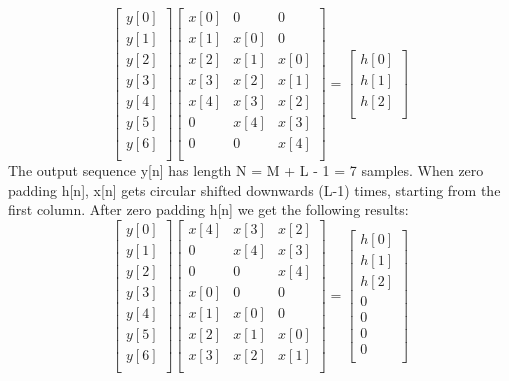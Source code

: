\documentclass{article}
\begin{document}
\[
\begin{bmatrix}
   y[0] \\
    y[1]   \\
    y[2] \\
    y[3]   \\  
    y[4]   \\ 
    y[5]   \\ 
    y[6]   \\ 
\end{bmatrix}
\begin{bmatrix}
    x[0] & 0  & 0  \\
    x[1] & x[0]  & 0  \\
    x[2] & x[1]  & x[0]  \\
    x[3] & x[2]  & x[1]  \\
    x[4] & x[3]  & x[2]  \\
    0 & x[4]  & x[3]  \\
    0 & 0  & x[4]  \\
\end{bmatrix}=
\begin{bmatrix}
    h[0]   \\
    h[1]  \\
    h[2]   \\
\end{bmatrix}
\]
The output sequence y[n] has length N = M + L - 1 = 7 samples. When zero padding h[n], x[n] gets circular shifted downwards (L-1) times, starting from the first column. After zero padding h[n] we get the following results:
\[
\begin{bmatrix}
   y[0] \\
    y[1]   \\
    y[2] \\
    y[3]   \\  
    y[4]   \\ 
    y[5]   \\ 
    y[6]   \\ 
\end{bmatrix}
\begin{bmatrix}
    x[4] & x[3]  & x[2]  \\
    0 & x[4]  & x[3]  \\
    0 & 0  & x[4]  \\
    x[0] & 0  & 0  \\
    x[1] & x[0]  & 0  \\
    x[2] &x[1]  & x[0]  \\
    x[3] & x[2]  & x[1]  \\
\end{bmatrix}=
\begin{bmatrix}
    h[0]   \\
    h[1]  \\
    h[2]   \\
    0   \\
    0   \\
    0   \\
    0   \\
\end{bmatrix}
\]
\end{document}
